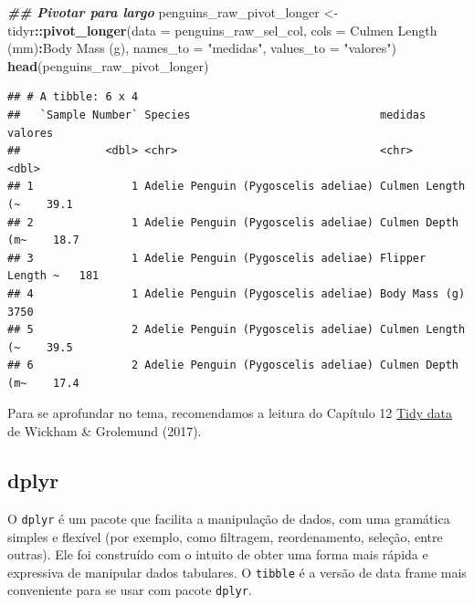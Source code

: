 \documentclass[
]{article}
\newenvironment{Shaded}{\begin{snugshade}}{\end{snugshade}}
\newcommand{\AttributeTok}[1]{\textcolor[rgb]{0.13,0.29,0.53}{#1}}
\newcommand{\DocumentationTok}[1]{\textcolor[rgb]{0.56,0.35,0.01}{\textbf{\textit{#1}}}}
\newcommand{\FunctionTok}[1]{\textcolor[rgb]{0.13,0.29,0.53}{\textbf{#1}}}
\newcommand{\NormalTok}[1]{#1}
\newcommand{\OtherTok}[1]{\textcolor[rgb]{0.56,0.35,0.01}{#1}}
\newcommand{\SpecialCharTok}[1]{\textcolor[rgb]{0.81,0.36,0.00}{\textbf{#1}}}
\newcommand{\StringTok}[1]{\textcolor[rgb]{0.31,0.60,0.02}{#1}}
\begin{document}
\begin{Shaded}
\begin{Highlighting}[]
\DocumentationTok{\#\# Pivotar para largo}
\NormalTok{penguins\_raw\_pivot\_longer }\OtherTok{\textless{}{-}}\NormalTok{ tidyr}\SpecialCharTok{::}\FunctionTok{pivot\_longer}\NormalTok{(}\AttributeTok{data =}\NormalTok{ penguins\_raw\_sel\_col, }
                                                 \AttributeTok{cols =} \StringTok{\textasciigrave{}}\AttributeTok{Culmen Length (mm)}\StringTok{\textasciigrave{}}\SpecialCharTok{:}\StringTok{\textasciigrave{}}\AttributeTok{Body Mass (g)}\StringTok{\textasciigrave{}}\NormalTok{,}
                                                 \AttributeTok{names\_to =} \StringTok{"medidas"}\NormalTok{, }
                                                 \AttributeTok{values\_to =} \StringTok{"valores"}\NormalTok{)}
\FunctionTok{head}\NormalTok{(penguins\_raw\_pivot\_longer)}
\end{Highlighting}
\end{Shaded}

\begin{verbatim}
## # A tibble: 6 x 4
##   `Sample Number` Species                             medidas          valores
##             <dbl> <chr>                               <chr>              <dbl>
## 1               1 Adelie Penguin (Pygoscelis adeliae) Culmen Length (~    39.1
## 2               1 Adelie Penguin (Pygoscelis adeliae) Culmen Depth (m~    18.7
## 3               1 Adelie Penguin (Pygoscelis adeliae) Flipper Length ~   181  
## 4               1 Adelie Penguin (Pygoscelis adeliae) Body Mass (g)     3750  
## 5               2 Adelie Penguin (Pygoscelis adeliae) Culmen Length (~    39.5
## 6               2 Adelie Penguin (Pygoscelis adeliae) Culmen Depth (m~    17.4
\end{verbatim}

Para se aprofundar no tema, recomendamos a leitura do Capítulo 12 \href{https://r4ds.had.co.nz/tidy-data.html}{Tidy data} de Wickham \& Grolemund (2017).

\hypertarget{dplyr}{%
\subsection{dplyr}\label{dplyr}}

O \texttt{dplyr} é um pacote que facilita a manipulação de dados, com uma gramática simples e flexível (por exemplo, como filtragem, reordenamento, seleção, entre outras). Ele foi construído com o intuito de obter uma forma mais rápida e expressiva de manipular dados tabulares. O \texttt{tibble} é a versão de data frame mais conveniente para se usar com pacote \texttt{dplyr}.
\end{document}
